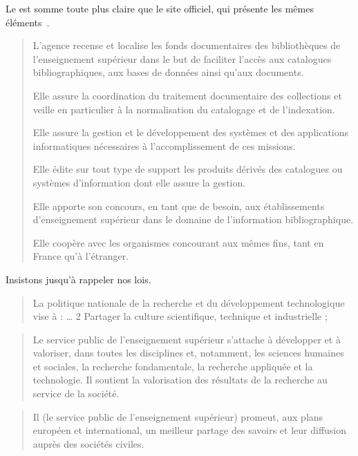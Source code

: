 Le  est somme toute plus claire que le site officiel, qui présente les mêmes éléments~\cite{_abes_????}.
\blockcquote{_decret_1994}
{L'agence recense et localise les fonds documentaires des bibliothèques de l'enseignement supérieur dans le but de faciliter l'accès aux catalogues bibliographiques, aux bases de données ainsi qu'aux documents.

Elle assure la coordination du traitement documentaire des collections et veille en particulier à la normalisation du catalogage et de l'indexation.

Elle assure la gestion et le développement des systèmes et des applications informatiques nécessaires à l'accomplissement de ces missions.

Elle édite sur tout type de support les produits dérivés des catalogues ou systèmes d'information dont elle assure la gestion.

Elle apporte son concours, en tant que de besoin, aux établissements d'enseignement supérieur dans le domaine de l'information bibliographique.

Elle coopère avec les organismes concourant aux mêmes fins, tant en France qu'à l'étranger.}

Insistons jusqu'à rappeler nos lois.
\blockcquote{_code_????-2}
{La politique nationale de la recherche et du développement technologique vise à :
\ldots
2 \textdegree Partager la culture scientifique, technique et industrielle ;}
\blockcquote{_code_????-1}
{Le service public de l'enseignement supérieur s'attache à développer et à valoriser, dans toutes les disciplines et, notamment, les sciences humaines et sociales, la recherche fondamentale, la recherche appliquée et la technologie.
Il soutient la valorisation des résultats de la recherche au service de la société.}
\blockcquote{_code_????}
{Il (le service public de l'enseignement supérieur) promeut, aux plans européen et international, un meilleur partage des savoirs et leur diffusion auprès des sociétés civiles.}

